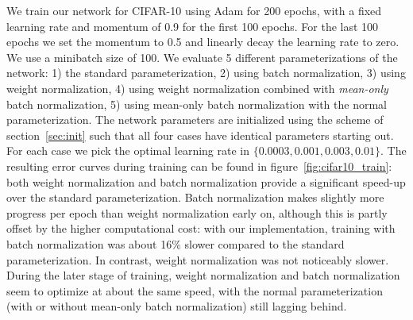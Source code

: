 \documentclass{article}
\begin{document}
We train our network for CIFAR-10 using Adam \cite{kingma2014adam} for 200 epochs, with a fixed learning rate and momentum of 0.9 for the first 100 epochs. For the last 100 epochs we set the momentum to 0.5 and linearly decay the learning rate to zero. We use a minibatch size of 100. We evaluate 5 different parameterizations of the network: 1) the standard parameterization, 2) using batch normalization, 3) using weight normalization, 4) using weight normalization combined with \emph{mean-only} batch normalization, 5) using mean-only batch normalization with the normal parameterization. The network parameters are initialized using the scheme of section~\ref{sec:init} such that all four cases have identical parameters starting out. For each case we pick the optimal learning rate in $\{0.0003, 0.001, 0.003, 0.01\}$. The resulting error curves during training can be found in figure~\ref{fig:cifar10_train}: both weight normalization and batch normalization provide a significant speed-up over the standard parameterization. Batch normalization makes slightly more progress per epoch than weight normalization early on, although this is partly offset by the higher computational cost: with our implementation, training with batch normalization was about 16\% slower compared to the standard parameterization. In contrast, weight normalization was not noticeably slower. During the later stage of training, weight normalization and batch normalization seem to optimize at about the same speed, with the normal parameterization (with or without mean-only batch normalization) still lagging behind.
\end{document}

